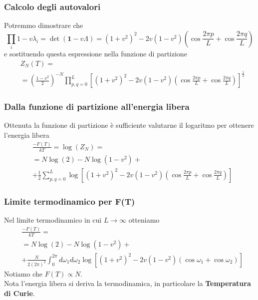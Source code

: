 \documentclass[11pt]{beamer}
\DeclareMathOperator{\Log}{log}
\DeclareMathOperator{\Det}{det}
\begin{document}
\begin{frame}
\frametitle{Calcolo degli autovalori}
Potremmo dimostrare che
$$
\prod_i1-v\lambda_i=\Det(\textbf{1}-v\Lambda)=(1+v^2)^2-2v(1-v^2) \left( \cos{\frac{2\pi p}{L}}+\cos{\frac{2\pi q}{L}} \right)
$$
e sostituendo questa espressione nella funzione di partizione
\begin{equation}
\begin{split}
&Z_N(T)=\\
&=\left( \frac{1-v^2}{2}\right)^{-N}\prod_{p,q=0}^L \left[ (1+v^2)^2-2v(1-v^2) \left( \cos{\frac{2\pi p}{L}}+\cos{\frac{2\pi q}{L}} \right) \right]^{\frac{1}{2}}
\end{split}
\end{equation}

\end{frame}

\begin{frame}
\frametitle{Dalla funzione di partizione all'energia libera}
Ottenuta la funzione di partizione è sufficiente valutarne il logaritmo per ottenere l'energia libera
\begin{equation}
\begin{split}
&\frac{-F(T)}{kT}=\Log(Z_N)=\\
&=N\Log(2)-N\Log(1-v^2)+\\
&+\frac{1}{2} \sum_{p,q=0}^L\Log\left[ (1+v^2)^2-2v(1-v^2) \left( \cos{\frac{2\pi p}{L}}+\cos{\frac{2\pi q}{L}} \right) \right]
\end{split}
\end{equation}
\end{frame}

\begin{frame}
\frametitle{Limite termodinamico per F(T)}
Nel limite termodinamico in cui $L\to \infty$ otteniamo
\begin{equation}
\begin{split}
&\frac{-F(T)}{kT}=\\
&=N\Log(2)-N\Log(1-v^2)+
\\&+\frac{N}{2(2\pi)^2}\int_0^{2\pi} d\omega_1 d\omega_2 \Log\left[ (1+v^2)^2-2v(1-v^2) \left( \cos{\omega_1}+\cos{\omega_2} \right) \right]
\end{split}
\end{equation}
Notiamo che $F(T) \propto N$.\\
Nota l'energia libera si deriva la termodinamica, in particolare la \textbf{Temperatura di Curie}.
\end{frame}
\end{document}
